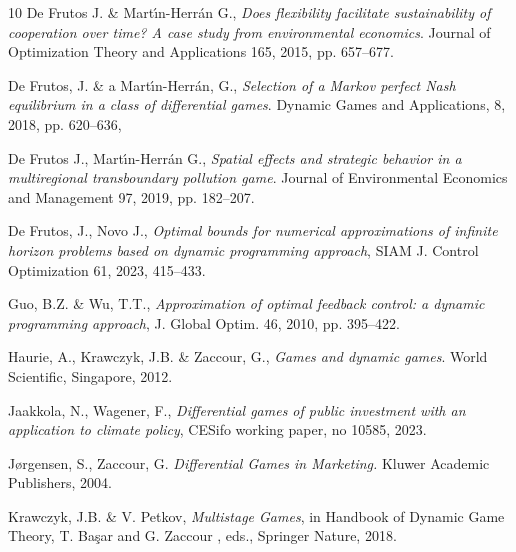 \documentclass[12pt]{article}
\begin{document}
\begin{thebibliography}{10}
  De Frutos  J. \&  Mart\'{\i}n-Herr\'{a}n  G.,   {\em Does flexibility facilitate sustainability of cooperation over time? A case study from environmental economics}.  Journal of Optimization Theory and Applications 165, 2015, pp. 657--677.

 De Frutos, J. \& a Mart\'{\i}n-Herr\'{a}n, G., {\em Selection of a Markov perfect Nash equilibrium in a class of differential games}. Dynamic Games and Applications,  8, 2018, pp. 620--636,

   De Frutos  J.,   Mart\'{\i}n-Herr\'{a}n  G.,  {\em Spatial effects and strategic behavior in a multiregional transboundary pollution  game}.  Journal of Environmental Economics and Management 97, 2019, pp. 182--207.

 De Frutos, J., Novo J., {\em Optimal bounds for numerical approximations of infinite horizon problems based on dynamic programming approach}, SIAM J. Control Optimization 61, 2023, 415--433.

 { Guo, B.Z. \&  Wu, T.T.},
{\em Approximation of optimal feedback control: a dynamic programming approach}, J. Global Optim. 46, 2010, pp. 395--422.

 Haurie,  A., Krawczyk, J.B. \&  Zaccour,  G.,  {\em Games and dynamic games}. World Scientific, Singapore, 2012.

 Jaakkola, N., Wagener, F., {\em Differential games of public investment with an application to climate policy}, CESifo working paper, no 10585, 2023.

 J{\o}rgensen, S., Zaccour, G.
{\em Differential Games in Marketing.}
 {Kluwer Academic Publishers, 2004.}

 Krawczyk, J.B. \& V. Petkov, {\em Multistage Games}, in Handbook of Dynamic Game Theory, T. Ba\c{s}ar and G. Zaccour , eds., Springer Nature, 2018.

  \end{thebibliography}
\end{document}
